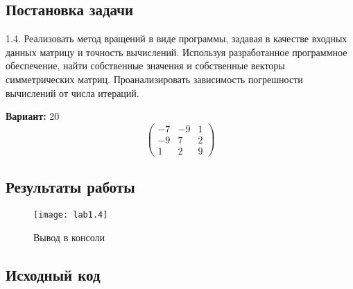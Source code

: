 \subsection{Постановка задачи}
1.4. Реализовать метод вращений в виде программы, задавая в качестве входных данных матрицу и точность вычислений. Используя разработанное программное обеспечение, найти собственные значения и собственные векторы симметрических матриц. Проанализировать зависимость погрешности вычислений от числа итераций. 

{\bfseries Вариант:} 20
\begin{equation}
      \begin{pmatrix}
        -7 & -9 & 1\\
        -9 & 7 & 2\\
        1 & 2 & 9
      \end{pmatrix}
\end{equation}
\pagebreak

\subsection{Результаты работы}

\begin{figure}[h!]
\centering
\texttt{[image: lab1.4]}
\caption{Вывод в консоли}
\end{figure}
\pagebreak

\vfill

\subsection{Исходный код}


\pagebreak